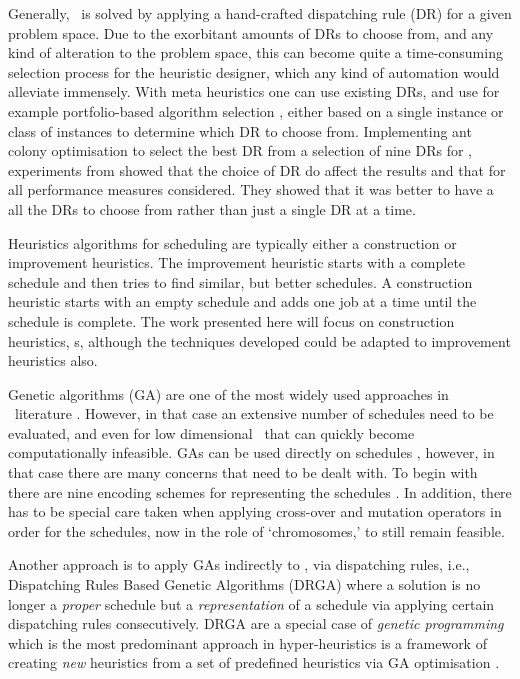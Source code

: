 \documentclass[smallextended]{svjour3}
\begin{document}
Generally, \jsp\ is solved by applying a hand-crafted dispatching rule (DR) for 
a given problem space. 
Due to the exorbitant amounts of DRs to choose from, and any kind of alteration 
to the problem space, this can become quite a time-consuming selection process 
for the heuristic designer, which any kind of automation would alleviate 
immensely. 
With meta heuristics one can use existing DRs, and use for example 
portfolio-based algorithm selection \cite{Rice76,Gomes01}, either based on a 
single instance or class of instances \cite{Xu07} to determine which DR to 
choose from. 
Implementing ant colony optimisation to select the best DR 
from a selection of nine DRs for \JSP, experiments from \cite{Korytkowski13} 
showed that the choice of DR do affect the results and that for all performance 
measures considered. They showed that it was better to have a all the DRs to 
choose from rather than just a single DR at a time.

Heuristics algorithms for scheduling are typically either a construction or 
improvement heuristics. The improvement heuristic starts with a complete 
schedule and then tries to find similar, but better schedules.  A construction 
heuristic starts with an empty schedule and adds one job at a time until the 
schedule is complete. The work presented here will focus on construction 
heuristics, \dr s, although the techniques developed could be adapted to 
improvement heuristics also. 

Genetic algorithms (GA) are one of the most widely used approaches in \JSP\ 
literature \cite{Pinedo08}. However, in that case an extensive number of 
schedules need to be evaluated, and even for low dimensional \JSP\ that can 
quickly become computationally infeasible.
GAs can be used directly on schedules 
\cite{Cheng96,Cheng99,Tsai07,Qing-dao-er-ji12,Ak12,Meeran12}, however, in that 
case there are many concerns that need to be dealt with. To begin with there 
are nine encoding schemes for representing the schedules \cite{Cheng96}. 
In addition, there has to be special care taken when applying cross-over and 
mutation operators in order for the schedules, now in the role of 
`chromosomes,' to still remain feasible. 

Another approach is to apply GAs indirectly to \JSP , via dispatching rules, 
i.e., Dispatching Rules Based Genetic Algorithms (DRGA) 
\cite{Vazquez-Rodriguez09,Dhingra10,Nguyen13} where a solution is no longer a 
\emph{proper} schedule but a \emph{representation} of a schedule via applying 
certain dispatching rules consecutively. 
DRGA are a special case of \emph{genetic programming} \cite{Koza05} which is 
the most predominant approach in hyper-heuristics is a framework of creating 
\emph{new} heuristics from a set of  predefined heuristics via GA optimisation 
\cite{Burke10}. 
\end{document}
